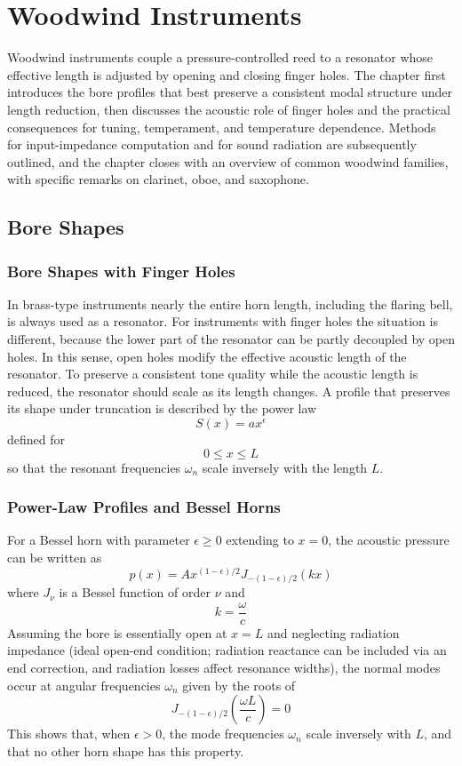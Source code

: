 
\chapter{Woodwind Instruments}

Woodwind instruments couple a pressure-controlled reed to a resonator whose effective length is adjusted by opening and closing finger holes. The chapter first introduces the bore profiles that best preserve a consistent modal structure under length reduction, then discusses the acoustic role of finger holes and the practical consequences for tuning, temperament, and temperature dependence. Methods for input-impedance computation and for sound radiation are subsequently outlined, and the chapter closes with an overview of common woodwind families, with specific remarks on clarinet, oboe, and saxophone. 

\section{Bore Shapes}

\subsection{Bore Shapes with Finger Holes}

In brass-type instruments nearly the entire horn length, including the flaring bell, is always used as a resonator. For instruments with finger holes the situation is different, because the lower part of the resonator can be partly decoupled by open holes. In this sense, open holes modify the effective acoustic length of the resonator. To preserve a consistent tone quality while the acoustic length is reduced, the resonator should scale as its length changes. A profile that preserves its shape under truncation is described by the power law
\[
S(x) = ax^{\epsilon}
\]
defined for
\[
0 \le x \le L
\]
so that the resonant frequencies \( \omega_n \) scale inversely with the length \( L \). 

\subsection{Power-Law Profiles and Bessel Horns}

For a Bessel horn with parameter \( \epsilon \ge 0 \) extending to \( x = 0 \), the acoustic pressure can be written as
\[
p(x) = Ax^{(1-\epsilon)/2}J_{-(1-\epsilon)/2}(kx)
\]
where \( J_{\nu} \) is a Bessel function of order \( \nu \) and
\[
k = \frac{\omega}{c}
\]
Assuming the bore is essentially open at \( x = L \) and neglecting radiation impedance (ideal open-end condition; radiation reactance can be included via an end correction, and radiation losses affect resonance widths), the normal modes occur at angular frequencies \( \omega_n \) given by the roots of
\[
J_{-(1-\epsilon)/2}\left(\frac{\omega L}{c}\right) = 0
\]
This shows that, when \( \epsilon > 0 \), the mode frequencies \( \omega_n \) scale inversely with \( L \), and that no other horn shape has this property. 

